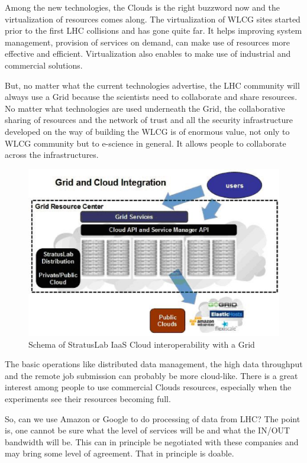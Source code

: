 Among the new technologies, the Clouds
is the right buzzword now and the virtualization of resources comes
along. The virtualization of WLCG sites started prior to the first
LHC collisions and has gone quite far. It helps improving system
management, provision of services on demand, can make use of
resources more effective and efficient. Virtualization also enables
to make use of industrial and commercial solutions.

But, no matter what the current technologies advertise, the LHC
community will always use a Grid because the scientists need to
collaborate and share resources. No matter what technologies are
used underneath the Grid, the collaborative sharing of resources and
the network of trust and all the security infrastructure developed
on the way of building the WLCG is of enormous value, not only to
WLCG community but to e-science in general. It allows people to
collaborate across the infrastructures.

\begin{figure}[htb] %
\centering
\includegraphics[width=13cm]{fig26.eps} %
\caption{Schema of StratusLab IaaS Cloud interoperability with a
Grid}\label{fig26}
\end{figure}


The basic operations like distributed data management, the high data
throughput and the remote job submission can probably be more
cloud-like. There is a great interest among people to use commercial
Clouds resources, especially when the experiments see their
resources becoming full.

So, can we use Amazon or Google to do processing of data from LHC?
The point is, one cannot be sure what the level of services will be
and what the IN/OUT bandwidth will be. This can in principle be
negotiated with these companies and may bring some level of
agreement. That in principle is doable.


